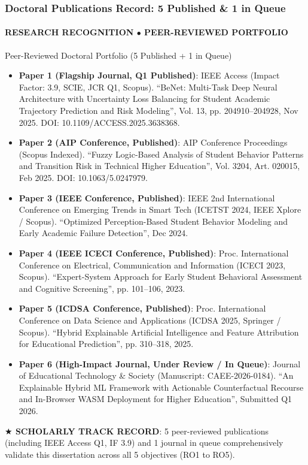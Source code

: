 \documentclass[aspectratio=169, 10pt]{beamer}
\newcommand{\leadbullet}[2]{\textbf{\color{NavyDark}#1}: \color{TextBody}#2}
\begin{document}
\begin{frame}
  \frametitle{Doctoral Publications Record: 5 Published \& 1 in Queue}
  \framesubtitle{RESEARCH RECOGNITION $\bullet$ PEER-REVIEWED PORTFOLIO}

  \begin{defensecard}{Peer-Reviewed Doctoral Portfolio (5 Published + 1 in Queue)}
    \begin{itemize}\setlength{\itemsep}{2pt}\setlength{\parskip}{0pt}\fontsize{8.2pt}{10.2pt}\selectfont
      \item \leadbullet{Paper 1 (Flagship Journal, Q1 Published)}{IEEE Access (Impact Factor: 3.9, SCIE, JCR Q1, Scopus). ``BeNet: Multi-Task Deep Neural Architecture with Uncertainty Loss Balancing for Student Academic Trajectory Prediction and Risk Modeling'', Vol. 13, pp. 204910--204928, Nov 2025. DOI: 10.1109/ACCESS.2025.3638368.}
      \item \leadbullet{Paper 2 (AIP Conference, Published)}{AIP Conference Proceedings (Scopus Indexed). ``Fuzzy Logic-Based Analysis of Student Behavior Patterns and Transition Risk in Technical Higher Education'', Vol. 3204, Art. 020015, Feb 2025. DOI: 10.1063/5.0247979.}
      \item \leadbullet{Paper 3 (IEEE Conference, Published)}{IEEE 2nd International Conference on Emerging Trends in Smart Tech (ICETST 2024, IEEE Xplore / Scopus). ``Optimized Perception-Based Student Behavior Modeling and Early Academic Failure Detection'', Dec 2024.}
      \item \leadbullet{Paper 4 (IEEE ICECI Conference, Published)}{Proc. International Conference on Electrical, Communication and Information (ICECI 2023, Scopus). ``Expert-System Approach for Early Student Behavioral Assessment and Cognitive Screening'', pp. 101--106, 2023.}
      \item \leadbullet{Paper 5 (ICDSA Conference, Published)}{Proc. International Conference on Data Science and Applications (ICDSA 2025, Springer / Scopus). ``Hybrid Explainable Artificial Intelligence and Feature Attribution for Educational Prediction'', pp. 310--318, 2025.}
      \item \leadbullet{Paper 6 (High-Impact Journal, Under Review / In Queue)}{Journal of Educational Technology \& Society (Manuscript: CAEE-2026-0184). ``An Explainable Hybrid ML Framework with Actionable Counterfactual Recourse and In-Browser WASM Deployment for Higher Education'', Submitted Q1 2026.}
    \end{itemize}
  \end{defensecard}
  \vspace{-0.1cm}

  \begin{takeawaybanner}
    \textbf{\color{GoldPill}$\bigstar$ SCHOLARLY TRACK RECORD}: 5 peer-reviewed publications (including IEEE Access Q1, IF 3.9) and 1 journal in queue comprehensively validate this dissertation across all 5 objectives (RO1 to RO5).
  \end{takeawaybanner}
\end{frame}
\end{document}

